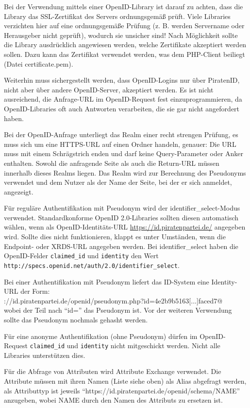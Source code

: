 Bei der Verwendung mittels einer OpenID-Library ist darauf zu achten, dass die Library das SSL-Zertifikat des Servers ordnungsgemäß prüft.
Viele Libraries verzichten hier auf eine ordnungsgemäße Prüfung (z. B. werden Servername oder Herausgeber nicht geprüft), wodurch sie unsicher sind!
Nach Möglichkeit sollte die Library ausdrücklich angewiesen werden, welche Zertifikate akzeptiert werden sollen.
Dazu kann das Zertifikat verwendet werden, was dem PHP-Client beiliegt (Datei certificate.pem).

Weiterhin muss sichergestellt werden, dass OpenID-Logins nur über PiratenID, nicht aber über andere OpenID-Server, akzeptiert werden.
Es ist nicht ausreichend, die Anfrage-URL im OpenID-Request fest einzuprogrammieren,
da OpenID-Libraries oft auch Antworten verarbeiten, die sie gar nicht angefordert haben.

Bei der OpenID-Anfrage unterliegt das Realm einer recht strengen Prüfung, es muss sich um eine HTTPS-URL auf einen Ordner handeln, genauer:
Die URL muss mit einem Schrägstrich enden und darf keine Query-Parameter oder Anker enthalten.
Sowohl die anfragende Seite als auch die Return-URL müssen innerhalb dieses Realms liegen.
Das Realm wird zur Berechnung des Pseudonyms verwendet und dem Nutzer als der Name der Seite, bei der er sich anmeldet, angezeigt.

Für reguläre Authentifikation mit Pseudonym wird der identifier\_select-Modus verwendet.
Standardkonforme OpenID 2.0-Libraries sollten diesen automatisch wählen, wenn als OpenID-Identitäts-URL \url{https://id.piratenpartei.de/} angegeben wird.
Sollte dies nicht funktionieren, klappt es unter Umständen, wenn die Endpoint- oder XRDS-URL angegeben werden.
Bei identifier\_select haben die OpenID-Felder \texttt{claimed\_id} und \texttt{identity} den Wert \texttt{http://specs.openid.net/auth/2.0/identifier\_select}.

Bei einer Authentifikation mit Pseudonym liefert das ID-System eine Identity-URL der Form:\\
\verb@https://id.piratenpartei.de/openid/pseudonym.php?id=4e2b9b5163[...]faced7@\\
wobei der Teil nach "`id="' das Pseudonym ist. Vor der weiteren Verwendung sollte das Pseudonym nochmals gehasht werden.

Für eine anonyme Authentifikation (ohne Pseudonym) dürfen im OpenID-Request \texttt{claimed\_id} und \texttt{identity} nicht mitgeschickt werden.
Nicht alle Libraries unterstützen dies.

Für die Abfrage von Attributen wird Attribute Exchange verwendet.
Die Attribute müssen mit ihren Namen (Liste siehe oben) als Alias abgefragt werden,
als Attributtyp ist jeweils "`https://id.piratenpartei.de/openid/schema/NAME"' anzugeben, wobei NAME durch den Namen des Attributs zu ersetzen ist.

